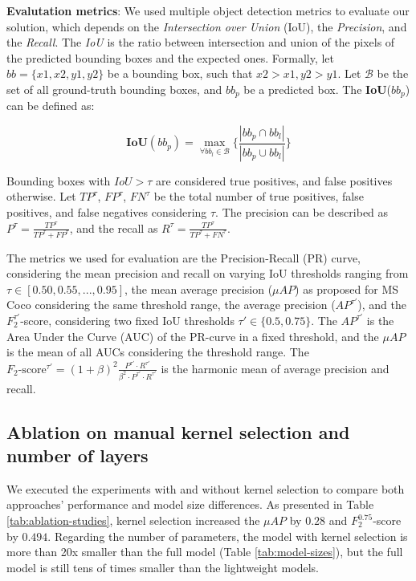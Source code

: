 \documentclass[times,twocolumn,final,authoryear]{elsarticle}
\begin{document}
    \textbf{Evalutation metrics}: We used multiple object detection metrics to evaluate our solution, which depends on the \textit{Intersection over Union} (IoU), the \textit{Precision}, and the \textit{Recall}. The \textit{IoU} is the ratio between intersection and union of the pixels of the predicted bounding boxes and the expected ones. Formally, let $bb = \{x1, x2, y1, y2\}$ be a bounding box, such that $x2 > x1, y2 > y1$. Let $\mathcal{B}$ be the set of all ground-truth bounding boxes, and $bb_p$ be a predicted box. The \textbf{IoU}($bb_p$) can be defined as:
    
    \begin{equation}
        \textbf{IoU}(bb_p) = \max_{\forall bb_l \in \mathcal{B}}\{ \frac{| bb_p \cap bb_l |}{| bb_p \cup bb_l|}\}
    \end{equation}
    
    Bounding boxes with $IoU > \tau$ are considered true positives, and false positives otherwise. Let $TP^{\tau}$, $FP^{\tau}$, $FN^{\tau}$ be the total number of true positives, false positives, and false negatives considering $\tau$. The precision can be described as $P^\tau = \frac{TP^\tau}{TP^\tau + FP^\tau}$, and the recall as $R^\tau = \frac{TP^\tau}{TP^\tau + FN^\tau}$.
    
    The metrics we used for evaluation are the Precision-Recall (PR) curve, considering the mean precision and recall on varying IoU thresholds ranging from $\tau \in [0.50, 0.55, ..., 0.95]$, the mean average precision ($\mu AP$) as proposed for MS Coco considering the same threshold range, the average precision ($AP^{\tau'}$), and the $F^{\tau'}_2$-score, considering two fixed IoU thresholds $\tau' \in \{0.5,0.75\}$. The $AP^{\tau'}$ is the Area Under the Curve (AUC) of the PR-curve in a fixed threshold, and the $\mu AP$ is the mean of all AUCs considering the threshold range. The $F_2\text{-score}^{\tau'} = (1+\beta)^{2} \frac{P^{\tau'}\cdot R^{\tau'}}{\beta^{2} \cdot P^{\tau'}\cdot R^{\tau'}}$ is the harmonic mean of average precision and recall.
    
\subsection{Ablation on manual kernel selection and number of layers}
    We executed the experiments with and without kernel selection to compare both approaches' performance and model size differences. As presented in Table \ref{tab:ablation-studies}, kernel selection increased the $\mu AP$ by $0.28$ and $F^{0.75}_2$-score by $0.494$. Regarding the number of parameters, the model with kernel selection is more than 20x smaller than the full model (Table \ref{tab:model-sizes}), but the full model is still tens of times smaller than the lightweight models.
    
\end{document}

